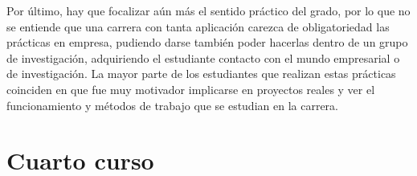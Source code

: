Por último, hay que focalizar aún más el sentido práctico del grado, por lo que no se 
entiende que una carrera con tanta aplicación carezca de obligatoriedad las prácticas en 
empresa, pudiendo darse también poder hacerlas dentro de un grupo de investigación, 
adquiriendo el estudiante contacto con el mundo empresarial o de investigación. La mayor parte 
de los estudiantes que realizan estas prácticas coinciden en que fue muy motivador implicarse en 
proyectos reales y ver el funcionamiento y métodos de trabajo que se estudian en la carrera.
\section{Cuarto curso}

